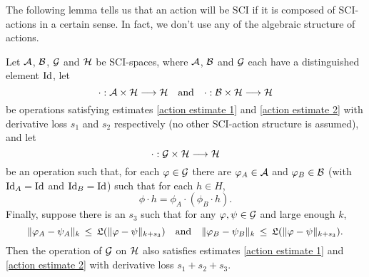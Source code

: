 \documentclass{article}
\begin{document}
The following lemma tells us that an action will be SCI if it is composed of SCI-actions in a certain sense.  In fact, we don't use any of the algebraic structure of actions.
\begin{lem}\label{composite action}
Let $\mathcal{A}$, $\mathcal{B}$, $\mathcal{G}$ and $\mathcal{H}$ be SCI-spaces, where $\mathcal{A}$, $\mathcal{B}$ and $\mathcal{G}$ each have a distinguished element $\textrm{Id}$, let
$$\cdot:\mathcal{A}\times\mathcal{H} \longrightarrow \mathcal{H} \quad\textnormal{and}\quad \cdot:\mathcal{B}\times\mathcal{H} \longrightarrow \mathcal{H}$$
be operations satisfying estimates \eqref{action estimate 1} and \eqref{action estimate 2} with derivative loss $s_1$ and $s_2$ respectively (no other SCI-action structure is assumed), and let
$$\cdot:\mathcal{G}\times\mathcal{H} \longrightarrow \mathcal{H}$$
be an operation such that, for each $\varphi \in \mathcal{G}$ there are $\varphi_A \in \mathcal{A}$ and $\varphi_B \in \mathcal{B}$ (with $\textrm{Id}_A=\textrm{Id}$ and $\textrm{Id}_B=\textrm{Id}$) such that for each $h \in H$,
$$\phi\cdot h = \phi_A\cdot(\phi_B\cdot h).$$
Finally, suppose there is an $s_3$ such that for any $\varphi,\psi \in \mathcal{G}$ and large enough $k$,
\begin{equation}\label{action comparison}
\|\phi_A-\psi_A\|_k \,\leq\, \LP(\|\phi-\psi\|_{k+s_3}) \quad\textnormal{and}\quad
\|\phi_B-\psi_B\|_k \,\leq\, \LP(\|\phi-\psi\|_{k+s_3}).
\end{equation}
Then the operation of $\mathcal{G}$ on $\mathcal{H}$ also satisfies estimates \eqref{action estimate 1} and \eqref{action estimate 2} with derivative loss $s_1+s_2+s_3$.
\end{lem}
\end{document}
